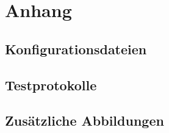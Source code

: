 \chapter{Anhang}

\section{Konfigurationsdateien}

\section{Testprotokolle}

\section{Zusätzliche Abbildungen}
